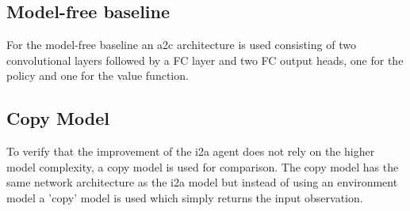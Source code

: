  
 


 

 
\subsection{Model-free baseline}

For the model-free baseline an a2c architecture is used consisting of two convolutional layers followed by a FC layer and two FC output heads, one for the policy and one for the value function.\\

\subsection{Copy Model}

To verify that the improvement of the i2a agent does not rely on the higher model complexity, a copy model is used for comparison. The copy model has the same network architecture as the i2a model but instead of using an environment model a 'copy' model is used which simply returns the input observation. 